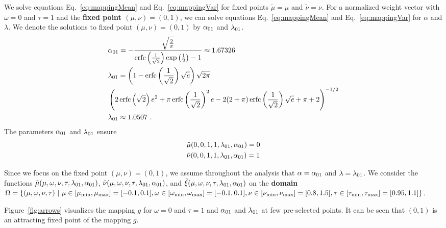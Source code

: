 \documentclass{article}
\newcommand\munn{{\tilde \mu}}
\newcommand\nunn{{\tilde \nu}}
\newcommand\xinn{{\tilde \xi}}
\DeclareMathOperator{\erfc}{erfc}
\begin{document}
We solve equations Eq.~\ref{eq:mappingMean} and
Eq.~\ref{eq:mappingVar} for fixed points $\munn= \mu$ and $\nunn= \nu$. 
For a normalized weight vector with $\omega=0$ and $\tau = 1$ and the
{\bf fixed point $(\mu,\nu)=(0,1)$},
 we can solve equations Eq.~\ref{eq:mappingMean} and 
Eq.~\ref{eq:mappingVar} for $\alpha$ and $\lambda$.
We denote the solutions to fixed point $(\mu,\nu)=(0,1)$
by  $\alpha_{\rm 01}$ and $\lambda_{\rm 01}$.
\begin{align}
\label{eq:alphalambda}
&\alpha_{\rm 01} =  -\frac{\sqrt{\frac{2}{\pi}}}{\erfc \left(\frac{1}{\sqrt{2}}\right) \exp \left(\frac{1}{2}\right)-1} \approx  1.67326\\ \nonumber
&\lambda_{\rm 01} =  \left(1-\erfc \left(\frac{1}{\sqrt{2}}\right) \sqrt{e}\right) \sqrt{2 \pi}  \\ \nonumber
&\left(2 \erfc \left(\sqrt{2}\right) e^2 +\pi
  \erfc \left(\frac{1}{\sqrt{2}}\right)^2 e -2 (2+\pi ) \erfc \left(\frac{1}{\sqrt{2}}\right) \sqrt{e}+\pi +2\right)^{-1/2}\\ \nonumber
&\lambda_{\rm 01} \approx  1.0507 \ .
\end{align}
The parameters $\alpha_{\rm 01}$ and $\lambda_{\rm 01}$ ensure 
\begin{align}
 &\munn(0, 0, 1, 1, \lambda_{\rm 01} ,\alpha_{\rm 01}) = 0 \nonumber \\
 &\nunn(0, 0, 1, 1, \lambda_{\rm 01} ,\alpha_{\rm 01}) = 1 \nonumber
\end{align}



Since we focus on the fixed point  $(\mu,\nu)=(0,1)$,
we assume throughout the analysis that $\alpha = \alpha_{\rm 01}$ and $\lambda=\lambda_{\rm 01}$.
We consider the functions $\munn(\mu, \omega,\nu,\tau,\lambda_{\rm 01} ,\alpha_{\rm 01})$, 
$\nunn(\mu, \omega,\nu,\tau,\lambda_{\rm 01} ,\alpha_{\rm 01})$, 
and $\xinn(\mu, \omega,\nu,\tau,\lambda_{\rm 01} ,\alpha_{\rm 01})$ 
on the {\bf domain} 
$\Omega = \{(\mu, \omega,\nu,\tau) \ | \  \mu \in [\mu_{\rm
  min},\mu_{\rm max}]= [-0.1,0.1], \omega \in [\omega_{\rm min},
\omega_{\rm max}]=[-0.1,0.1],
\nu \in [\nu_{\rm min},\nu_{\rm max}]=
[0.8,1.5], \tau \in [\tau_{\rm min},\tau_{\rm max}]=[0.95,1.1] \}$.

Figure~\ref{fig:arrows} visualizes 
the mapping $g$ for $\omega=0$ and $\tau=1$ and 
$\alpha_{\rm 01}$ and $\lambda_{\rm 01}$ at few pre-selected points.
It can be seen that $(0,1)$ is an attracting 
fixed point of the mapping $g$.
\end{document}
